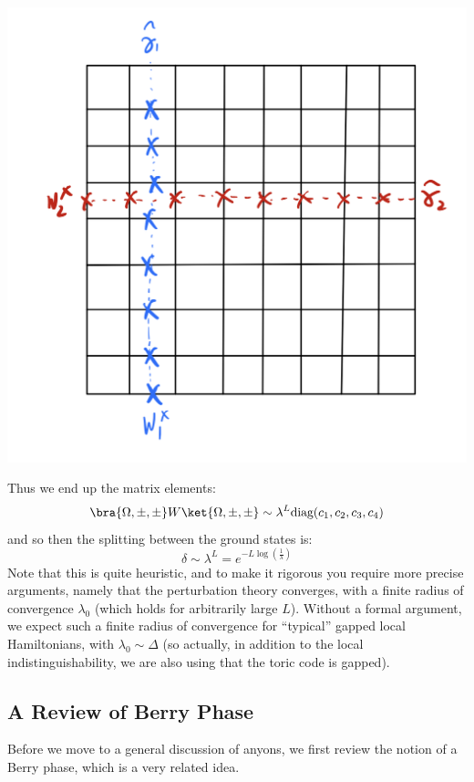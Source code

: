 \begin{center}
    \includegraphics[scale=0.3]{Lectures/Images/lec3-strings.png}
\end{center}

Thus we end up the matrix elements:
\begin{equation}
    \bra{\Omega, \pm, \pm}W\ket{\Omega, \pm, \pm} \sim \lambda^L\text{diag}(c_1, c_2, c_3, c_4)
\end{equation}
and so then the splitting between the ground states is:
\begin{equation}
    \delta \sim \lambda^L = e^{-L\log(\frac{1}{\lambda})}
\end{equation}
Note that this is quite heuristic, and to make it rigorous you require more precise arguments, namely that the perturbation theory converges, with a finite radius of convergence $\lambda_0$ (which holds for arbitrarily large $L$). Without a formal argument, we expect such a finite radius of convergence for ``typical'' gapped local Hamiltonians, with $\lambda_0 \sim \Delta$ (so actually, in addition to the local indistinguishability, we are also using that the toric code is gapped).

\subsection{A Review of Berry Phase}
Before we move to a general discussion of anyons, we first review the notion of a Berry phase, which is a very related idea.

